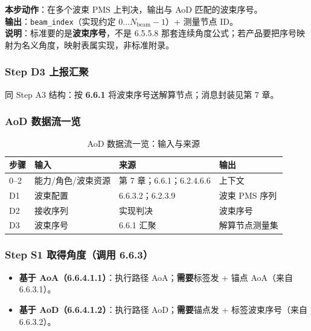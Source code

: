 \documentclass[11pt,a4paper]{ctexart}
\begin{document}
\textbf{本步动作}：在多个波束 PMS 上判决，输出与 AoD 匹配的波束序号。\\
\textbf{输出}：\texttt{beam\_index}（实现约定 $0\ldots N_{\mathrm{beam}}-1$）+ 测量节点 ID。\\
\textbf{说明}：标准要的是\textbf{波束序号}，不是 6.5.5.8 那套连续角度公式；若产品要把序号映射为名义角度，映射表属实现，非标准附录。

\subsubsection{Step D3 上报汇聚}

同 Step A3 结构：按 \textbf{6.6.1} 将波束序号送解算节点；消息封装见第 7 章。

\subsubsection{AoD 数据流一览}

\begin{longtable}{llll}
\caption{AoD 数据流一览：输入与来源\label{tab:step120}} \\
\toprule
\textbf{步骤} & \textbf{输入} & \textbf{来源} & \textbf{输出} \\
\midrule
0--2 & 能力/角色/波束资源 & 第 7 章；6.6.1；6.2.4.6.6 & 上下文 \\
D1 & 波束配置 & 6.6.3.2；6.2.3.9 & 波束 PMS 序列 \\
D2 & 接收序列 & 实现判决 & 波束序号 \\
D3 & 波束序号 & 6.6.1 汇聚 & 解算节点测量集 \\
\bottomrule
\end{longtable}


\label{sec:single}

\subsubsection{Step S1 取得角度（调用 6.6.3）}

\begin{itemize}[nosep]
  \item \textbf{基于 AoA（6.6.4.1.1）}：执行路径 AoA；\textbf{需要}标签发 + 锚点 AoA（来自 6.6.3.1）。
  \item \textbf{基于 AoD（6.6.4.1.2）}：执行路径 AoD；\textbf{需要}锚点发 + 标签波束序号（来自 6.6.3.2）。
\end{itemize}
\end{document}
